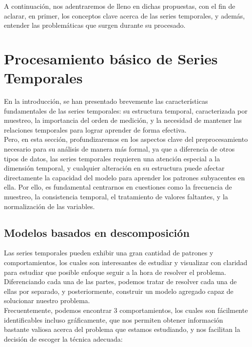 A continuación, nos adentraremos de lleno en dichas propuestas, con el fin de aclarar, en primer, los conceptos clave acerca de las series temporales, y además, entender las problemáticas que surgen durante su procesado.


\section{Procesamiento básico de Series Temporales}

En la introducción, se han presentado brevemente las características fundamentales de las series temporales: su estructura temporal, caracterizada por muestreo, la importancia del orden de medición, y la necesidad de mantener las relaciones temporales para lograr aprender de forma efectiva.\\

Pero, en esta sección, profundizaremos en los aspectos clave del preprocesamiento necesario para su análisis de manera más formal, ya que a diferencia de otros tipos de datos, las series temporales requieren una atención especial a la dimensión temporal, y cualquier alteración en su estructura puede afectar directamente la capacidad del modelo para aprender los patrones subyacentes en ella. Por ello, es fundamental centrarnos en cuestiones como la frecuencia de muestreo, la consistencia temporal, el tratamiento de valores faltantes, y la normalización de las variables.

\subsection{Modelos basados en descomposición}

Las series temporales pueden exhibir una gran cantidad de patrones y comportamientos, los cuales son interesantes de estudiar y visualizar con claridad para estudiar que posible enfoque seguir a la hora de resolver el problema. Diferenciando cada una de las partes, podemos tratar de resolver cada una de ellas por separado, y posteriormente, construir un modelo agregado capaz de solucionar nuestro problema.\\

Frecuentemente, podemos encontrar 3 comportamientos, los cuales son fácilmente identificables incluso gráficamente, que nos permiten obtener información bastante valiosa acerca del problema que estamos estudiando, y nos facilitan la decisión de escoger la técnica adecuada:


